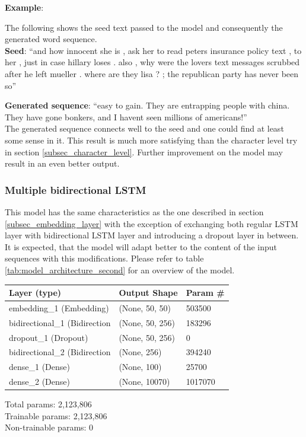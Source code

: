\documentclass[hidelinks, conference]{IEEEtran}
\begin{document}
\textbf{Example}:

The following shows the seed text passed to the model and consequently the generated word sequence.\\

\textbf{Seed}: ``and how innocent she is , ask her to read peters insurance policy text , to her , just in case hillary loses . also , why were the lovers text messages scrubbed after he left mueller . where are they lisa ? ; the republican party has never been so''

\textbf{Generated sequence}: ``easy to gain. They are entrapping people with china. They have gone bonkers, and I havent seen millions of americans!''\\

The generated sequence connects well to the seed and one could find at least some sense in it. This result is much more satisfying than the character level try in section \ref{subsec_character_level}. Further improvement on the model may result in an even better output.

\subsubsection{Multiple bidirectional LSTM}\label{subsec_multi_bi_lstm}

This model has the same characteristics as the one described in section \ref{subsec_embedding_layer} with the exception of exchanging both regular LSTM layer with bidirectional LSTM layer and introducing a dropout layer in between. It is expected, that the model will adapt better to the content of the input sequences with this modifications. Please refer to table \ref{tab:model_architecture_second} for an overview of the model.

\begin{center}
\begin{tabular}{l l l}
\hline
Layer (type) & Output Shape & Param \#\\
\hline
\hline
embedding\_1 (Embedding) & (None, 50, 50) & 503500\\
\hline
bidirectional\_1 (Bidirection & (None, 50, 256) & 183296\\
\hline
dropout\_1 (Dropout) & (None, 50, 256) & 0\\
\hline
bidirectional\_2 (Bidirection & (None, 256) & 394240\\
\hline
dense\_1 (Dense) & (None, 100) & 25700\\
\hline
dense\_2 (Dense) & (None, 10070) & 1017070\\
\hline
\hline
\end{tabular}
\begin{flushleft}
Total params: 2,123,806\\
Trainable params: 2,123,806\\
Non-trainable params: 0
\end{flushleft}
\end{center}
\end{document}
